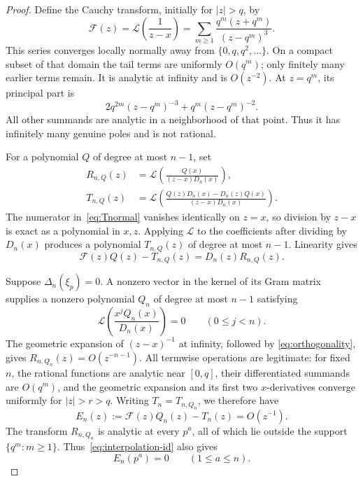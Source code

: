\documentclass[11pt]{article}
\theoremstyle{remark}
\newcommand{\Lcal}{\mathcal L}
\begin{document}
\begin{proof}
Define the Cauchy transform, initially for $|z|>q$, by
\begin{equation}\label{eq:cauchy}
 \mathcal F(z)=\Lcal\left(\frac1{z-x}\right)
   =\sum_{m\ge1}\frac{q^m(z+q^m)}{(z-q^m)^3}.
\end{equation}
This series converges locally normally away from
$\{0,q,q^2,\ldots\}$. On a compact subset of that domain the tail
terms are uniformly $O(q^m)$; only finitely many earlier terms remain.
It is analytic at infinity and is $O(z^{-2})$. At $z=q^m$, its
principal part is
\[
 2q^{2m}(z-q^m)^{-3}+q^m(z-q^m)^{-2}.
\]
All other summands are analytic in a neighborhood of that point.
Thus it has infinitely many genuine poles and is not rational.

For a polynomial $Q$ of degree at most $n-1$, set
\begin{align}
 R_{n,Q}(z)&=\Lcal\left(\frac{Q(x)}{(z-x)D_n(x)}\right),
 \label{eq:Rnormal}\\
 T_{n,Q}(z)&=\Lcal\left(
 \frac{Q(z)D_n(x)-D_n(z)Q(x)}{(z-x)D_n(x)}\right).
 \label{eq:Tnormal}
\end{align}
The numerator in~\eqref{eq:Tnormal} vanishes identically on $z=x$,
so division by $z-x$ is exact as a polynomial in $x,z$. Applying
$\Lcal$ to the coefficients after dividing by $D_n(x)$ produces a
polynomial $T_{n,Q}(z)$ of degree at most $n-1$. Linearity gives
\begin{equation}\label{eq:interpolation-id}
 \mathcal F(z)Q(z)-T_{n,Q}(z)=D_n(z)R_{n,Q}(z).
\end{equation}

Suppose $\Delta_n(\xi_p)=0$. A nonzero vector in the kernel of its
Gram matrix supplies a nonzero polynomial $Q_n$ of degree at most
$n-1$ satisfying
\begin{equation}\label{eq:orthogonality}
 \Lcal\left(\frac{x^jQ_n(x)}{D_n(x)}\right)=0
       \qquad(0\le j<n).
\end{equation}
The geometric expansion of $(z-x)^{-1}$ at infinity, followed by
\eqref{eq:orthogonality}, gives $R_{n,Q_n}(z)=O(z^{-n-1})$.
All termwise operations are legitimate: for fixed $n$, the rational
functions are analytic near $[0,q]$, their differentiated summands
are $O(q^m)$, and the geometric expansion and its first two
$x$-derivatives converge uniformly for $|z|>r>q$.
Writing $T_n=T_{n,Q_n}$, we therefore have
\begin{equation}\label{eq:errornormal}
 E_n(z):=\mathcal F(z)Q_n(z)-T_n(z)=O(z^{-1}).
\end{equation}
The transform $R_{n,Q_n}$ is analytic at every $p^a$, all of which
lie outside the support $\{q^m:m\ge1\}$. Thus~\eqref{eq:interpolation-id}
also gives
\begin{equation}\label{eq:exterior-zeros}
 E_n(p^a)=0\qquad(1\le a\le n).
\end{equation}


\end{proof}
\end{document}
